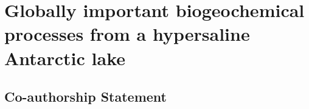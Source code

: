 \chapter[Organic Lake]{Globally important biogeochemical processes from a hypersaline Antarctic lake}
\label{ch:org}
\section*{Co-authorship Statement}
